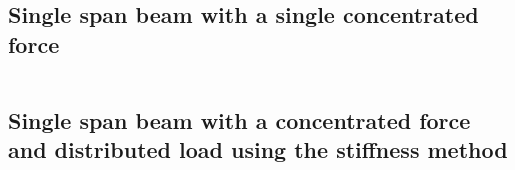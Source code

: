 \documentclass[11pt, oneside]{article}   	%
\begin{document}
\subsection{Single span beam with a single concentrated force}

\begin{equation}
   \label{B1}
\end{equation}
\begin{equation}
   \label{B2}
\end{equation}
\begin{equation}
   \label{B3}
\end{equation}
\begin{equation}
   \label{B4}
\end{equation}
\begin{equation}
   \label{B5}
\end{equation}
\begin{equation}
   \label{B6}
\end{equation}
\begin{equation}
   \label{B7}
\end{equation}
\begin{equation}
   \label{B8}
\end{equation}
\begin{equation}
   \label{B9}
\end{equation}
\begin{equation}
   \label{B10}
\end{equation}

\subsection{Single span beam with a concentrated force and distributed load using the stiffness method}

\begin{equation}
   \label{C1}
\end{equation}
\begin{equation}
   \label{C2}
\end{equation}
\begin{equation}
   \label{C3}
\end{equation}
\begin{equation}
   \label{C4}
\end{equation}
\begin{equation}
   \label{C5}
\end{equation}
\begin{equation}
   \label{C6}
\end{equation}
\begin{equation}
   \label{C7}
\end{equation}
\begin{equation}
   \label{C8}
\end{equation}
\begin{equation}
   \label{C9}
\end{equation}
\begin{equation}
   \label{C10}
\end{equation}
\end{document}

